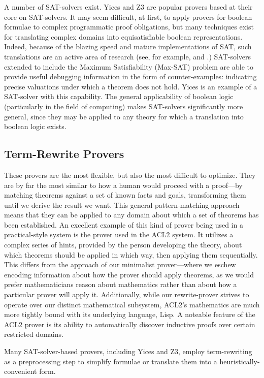 A number of SAT-solvers exist.  Yices\cite{yices} and Z3 are popular provers based at their core on SAT-solvers.  It may seem difficult, at first, to apply provers for boolean formulae to complex programmatic proof obligations, but many techniques exist for translating complex domains into equisatisfiable boolean representations.  Indeed, because of the blazing speed and mature implementations of SAT, such translations are an active area of research (see, for example, \cite{ganeshArrayDecision} and \cite{sheiniIntegerDecision}.)  SAT-solvers extended to include the Maximum Satisfiability (Max-SAT) problem are able to provide useful debugging information in the form of counter-examples: indicating precise valuations under which a theorem does not hold.  Yices is an example of a SAT-solver with this capability.  The general applicability of boolean logic (particularly in the field of computing) makes SAT-solvers significantly more general, since they may be applied to any theory for which a translation into boolean logic exists.

\subsection{Term-Rewrite Provers}  These provers are the most flexible, but also the most difficult to optimize.  They are by far the most similar to how a human would proceed with a proof---by matching theorems against a set of known facts and goals, transforming them until we derive the result we want.  This general pattern-matching approach means that they can be applied to any domain about which a set of theorems has been established.  An excellent example of this kind of prover being used in a practical-style system is the prover used in the ACL2 system.  It utilizes a complex series of hints, provided by the person developing the theory, about which theorems should be applied in which way, then applying them sequentially.  This differs from the approach of our minimalist prover---where we eschew encoding information about how the prover should apply theorems, as we would prefer mathematicians reason about mathematics rather than about how a particular prover will apply it.  Additionally, while our rewrite-prover strives to operate over our distinct mathematical subsystem, ACL2's mathematics are much more tightly bound with its underlying language, Lisp.  A noteable feature of the ACL2 prover is its ability to automatically discover inductive proofs over certain restricted domains.

Many SAT-solver-based provers, including Yices and Z3, employ term-rewriting as a preprocessing step to simplify formulae or translate them into a heuristically-convenient form.

